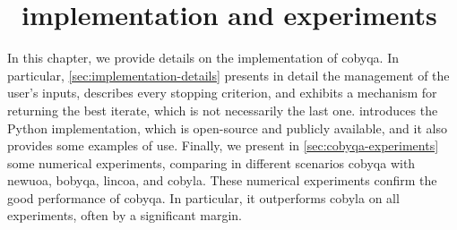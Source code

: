 %
%
%
\chapter{ \textemdash\ implementation and experiments}
\label{ch:cobyqa-implementation}

In this chapter, we provide details on the implementation of \gls{cobyqa}.
In particular, \cref{sec:implementation-details} presents in detail the management of the user's inputs, describes every stopping criterion, and exhibits a mechanism for returning the best iterate, which is not necessarily the last one.
 introduces the Python implementation, which is open-source and publicly available, and it also provides some examples of use.
Finally, we present in \cref{sec:cobyqa-experiments} some numerical experiments, comparing in different scenarios \gls{cobyqa} with \gls{newuoa}, \gls{bobyqa}, \gls{lincoa}, and \gls{cobyla}.
These numerical experiments confirm the good performance of \gls{cobyqa}.
In particular, it outperforms \gls{cobyla} on all experiments, often by a significant margin.


